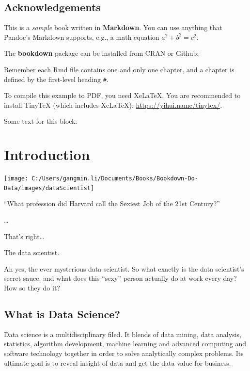 \documentclass[
]{book}
\makeatletter
\newenvironment{kframe}{%
\medskip{}
\setlength{\fboxsep}{.8em}
 \def\at@end@of@kframe{}%
 \ifinner\ifhmode%
  \def\at@end@of@kframe{\end{minipage}}%
  \begin{minipage}{\columnwidth}%
 \fi\fi%
 \def\FrameCommand##1{\hskip\@totalleftmargin \hskip-\fboxsep
 \colorbox{shadecolor}{##1}\hskip-\fboxsep
     \hskip-\linewidth \hskip-\@totalleftmargin \hskip\columnwidth}%
 \MakeFramed {\advance\hsize-\width
   \@totalleftmargin\z@ \linewidth\hsize
   \@setminipage}}%
 {\par\unskip\endMakeFramed%
 \at@end@of@kframe}
\newenvironment{rmdblock}[1]
  {
  \begin{itemize}
  \renewcommand{\labelitemi}{
    \raisebox{-.7\height}[0pt][0pt]{
      {\setkeys{Gin}{width=3em,keepaspectratio}\texttt{[image: images/\#1]}}
    }
  }
  \setlength{\fboxsep}{1em}
  \begin{kframe}
  \item
  }
  {
  \end{kframe}
  \end{itemize}
  }
\newenvironment{rmdnote}
  {\begin{rmdblock}{note}}
  {\end{rmdblock}}
\newenvironment{rmdcaution}
  {\begin{rmdblock}{caution}}
  {\end{rmdblock}}
\makeatother
\begin{document}
\hypertarget{acknowledgements}{%
\section*{Acknowledgements}\label{acknowledgements}}


This is a \emph{sample} book written in \textbf{Markdown}. You can use anything that Pandoc's Markdown supports, e.g., a math equation \(a^2 + b^2 = c^2\).

The \textbf{bookdown} package can be installed from CRAN or Github:

Remember each Rmd file contains one and only one chapter, and a chapter is defined by the first-level heading \texttt{\#}.

To compile this example to PDF, you need XeLaTeX. You are recommended to install TinyTeX (which includes XeLaTeX): \url{https://yihui.name/tinytex/}.

\begin{rmdcaution}
Some text for this block.
\end{rmdcaution}

\hypertarget{intro}{%
\chapter{Introduction}\label{intro}}

\begin{center}\texttt{[image: C:/Users/gangmin.li/Documents/Books/Bookdown-Do-Data/images/dataScientist]} \end{center}

\begin{rmdnote}
``What profession did Harvard call the Sexiest Job of the 21st Century?''

\ldots{}

That's right\ldots{}

The data scientist.
\end{rmdnote}

Ah yes, the ever mysterious data scientist. So what exactly is the data scientist's secret sauce, and what does this ``sexy'' person actually do at work every day? How so they do it?

\hypertarget{what-is-data-science}{%
\section{What is Data Science?}\label{what-is-data-science}}

Data science is a multidisciplinary filed. It blends of data mining, data analysis, statistics, algorithm development, machine learning and advanced computing and software technology together in order to solve analytically complex problems. Its ultimate goal is to reveal insight of data and get the data value for business.
\end{document}
